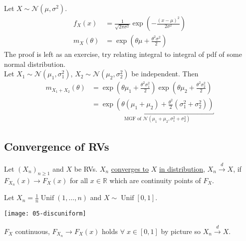 \begin{example} \label{exm:mgf-normal}
    Let $X \sim \mathcal{N}(\mu, \sigma^2)$.
    \begin{align*}
        f_X(x) &= \frac{1}{\sqrt{2 \pi \sigma^2}} \exp \left( - \frac{(x - \mu)^2}{2 \sigma^2} \right) \\
        m_X(\theta) &= \exp \left( \theta \mu + \frac{\theta^2 \sigma^2}{2} \right)
    \end{align*}
    The proof is left as an exercise, try relating integral to integral of pdf of some normal distribution. \\
    Let $X_1 \sim \mathcal{N}(\mu_1, \sigma_1^2)$, $X_2 \sim \mathcal{N}(\mu_2, \sigma_2^2)$ be independent.
    Then 
    \begin{align*}
        m_{X_1 + X_2}(\theta) &= \exp \left(\theta \mu_1 + \frac{\theta^2 \sigma_1^2}{2} \right) \exp \left( \theta \mu_2 + \frac{\theta^2 \sigma_2^2}{2} \right) \\
        &= \underbracket{\exp \left( \theta (\mu_1 + \mu_2) + \frac{\theta^2}{2} (\sigma_1^2 + \sigma_2^2) \right)}_{\text{MGF of } \mathcal{N}(\mu_1 + \mu_2, \sigma_1^2 + \sigma_2^2)}
    \end{align*}
\end{example}

\subsection{Convergence of RVs}

\begin{definition}
    Let $(X_n)_{n \geq 1}$ and $X$ be RVs.
    $X_n$ \underline{converges to} $X$ \underline{in distribution}, $X_n \overset{d}{\to} X$, if $F_{X_n}(x) \to F_X(x)$ for all $x \in \mathbb{R}$ which are continuity points of $F_X$.
\end{definition} 

\begin{example} \label{exm:conv1}
    Let $X_n = \frac{1}{n} \operatorname{Unif}\left( {1, \dots, n} \right)$ and $X \sim \operatorname{Unif} [0, 1]$.
    {\par \centering \texttt{[image: 05-discuniform]} \par}
    $F_X$ continuous, $F_{X_n} \to F_X(x)$ holds $\forall \; x \in [0, 1]$ by picture so $X_n \overset{d}{\to} X$.
\end{example} 

